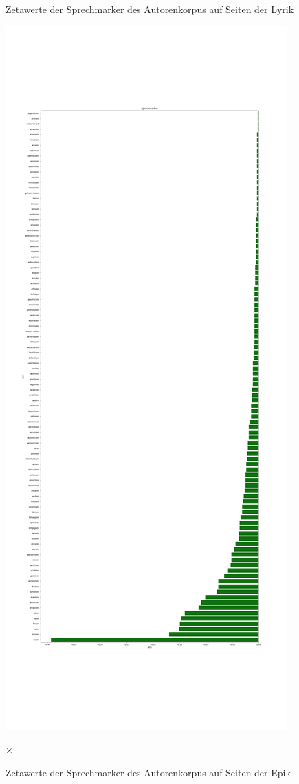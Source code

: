 \documentclass[a4paper,10p]{article}
\begin{document}
\begin{figure}{}
\begin{minipage}[b]{.45\linewidth}
        \caption{Zetawerte der Sprechmarker des Autorenkorpus auf Seiten der Lyrik}
        \label{autoren_sprechmarker}
    \end{minipage}
    \hfill
    \begin{minipage}[b]{.45\linewidth}
        \centering
        \includegraphics[width=\linewidth]{autoren_sprechmarker_lang_pro_wort2.png}
        \caption{Zetawerte der Sprechmarker des Autorenkorpus auf Seiten der Epik} 
        \label{autoren_sprechmarker2}×
    \end{minipage}
\end{figure}
\end{document}
